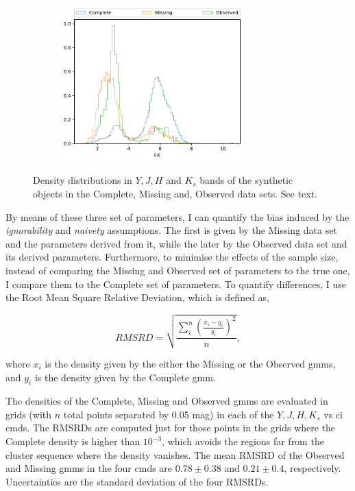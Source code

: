 \begin{figure}[ht!]
\begin{subfigure}[t]{0.45\textwidth}
      \includegraphics[page=5,height=6cm]{background/Figures/Check_distributions.pdf}
    \end{subfigure}
\caption{Density distributions in $Y,J,H$ and $K_s$ bands of the synthetic objects in the Complete, Missing and, Observed data sets. See text.}
\label{fig:ignorability_synthetic}
\end{figure}

By means of these three set of parameters, I can quantify the bias induced by the \emph{ignorability} and \emph{naivety} assumptions. The first is given by the Missing data set and the parameters derived from it, while the later by the Observed data set and its derived parameters. Furthermore, to minimise the effects of the sample size, instead of comparing the Missing and Observed set of parameters to the true one, I  compare them to the Complete set of parameters. To quantify differences, I use the Root Mean Square Relative Deviation, which is defined as, 

\begin{equation}
\label{eq:rmsrd}
RMSRD = \sqrt{\frac{\sum_i^n\left(\frac{x_i-y_i}{y_i}\right)^2}{n}}, \nonumber
\end{equation}

where $x_i$ is the density given by the either the Missing or the Observed \glspl{gmm}, and $y_i$ is the density given by the Complete \gls{gmm}. 

The densities of the Complete, Missing and Observed \glspl{gmm} are evaluated in grids (with $n$ total points separated by 0.05 mag) in each of the $Y,J,H,K_s$ vs \gls{ci} \glspl{cmd}. The RMSRDs are computed just for those points in the grids where the Complete density is higher than $10^{-3}$, which avoids the regions far from the cluster sequence where the density vanishes. The mean RMSRD of the Observed  and Missing \glspl{gmm} in the four \glspl{cmd} are $0.78\pm0.38$ and $0.21\pm0.4$, respectively. Uncertainties are the standard deviation of the four RMSRDs.

